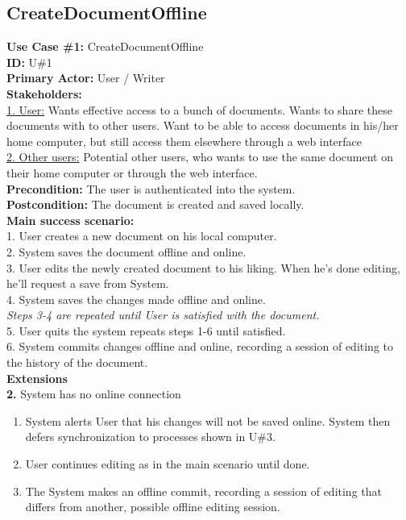 \subsection{CreateDocumentOffline}
\textbf{Use Case \#1:} CreateDocumentOffline\\
\textbf{ID:} U\#1\\
\textbf{Primary Actor:} User / Writer\\
\textbf{Stakeholders:}\\
\underline{1. User:} Wants effective access to a bunch of documents. Wants to share these documents with to other users. Want to be able to access documents in his/her home computer, but still access them elsewhere through a web interface\\
\underline{2. Other users:} Potential other users, who wants to use the same document on their home computer or through the web interface.\\
\newline
\textbf{Precondition:} The user is authenticated into the system.\\
\textbf{Postcondition:} The document is created and saved locally.\\
\newline
\textbf{Main success scenario:} \\
1. User creates a new document on his local computer.\\
2. System saves the document offline and online. \\
3. User edits the newly created document to his liking. When he’s done editing, he’ll request a save from System.\\
4. System saves the changes made offline and online.\\
\indent\textit{Steps 3-4 are repeated until User is satisfied with the document.}\\
5. User quits the system repeats steps 1-6 until satisfied.\\
6. System commits changes offline and online, recording a session of editing to the history of the document.\\
\newline
\textbf{Extensions}\\
\textbf{2.} System has no online connection
\begin{enumerate}
\item System alerts User that his changes will not be saved online. System then defers synchronization to processes shown in U\#3.
\item User continues editing as in the main scenario until done.
\item The System makes an offline commit, recording a session of editing that differs from another, possible offline editing session.
\end{enumerate}

